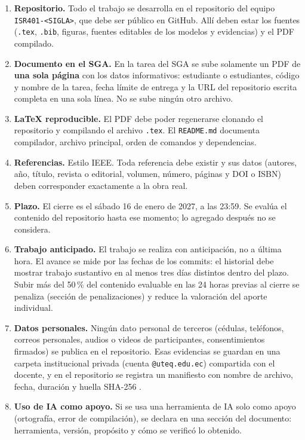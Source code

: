\documentclass[11pt]{article}
\begin{document}
\begin{enumerate}[leftmargin=20pt,itemsep=3pt]
	\item \textbf{Repositorio.} Todo el trabajo se desarrolla en el repositorio del equipo \texttt{ISR401-<SIGLA>}, que debe ser público en GitHub. Allí deben estar los fuentes (\texttt{.tex}, \texttt{.bib}, figuras, fuentes editables de los modelos y evidencias) y el PDF compilado.
	\item \textbf{Documento en el SGA.} En la tarea del SGA se sube solamente un PDF de \textbf{una sola página} con los datos informativos: estudiante o estudiantes, código y nombre de la tarea, fecha límite de entrega y la URL del repositorio escrita completa en una sola línea. No se sube ningún otro archivo.
	\item \textbf{\LaTeX{} reproducible.} El PDF debe poder regenerarse clonando el repositorio y compilando el archivo \texttt{.tex}. El \texttt{README.md} documenta compilador, archivo principal, orden de comandos y dependencias.
	\item \textbf{Referencias.} Estilo IEEE. Toda referencia debe existir y sus datos (autores, año, título, revista o editorial, volumen, número, páginas y DOI o ISBN) deben corresponder exactamente a la obra real.
	\item \textbf{Plazo.} El cierre es el sábado 16 de enero de 2027, a las 23:59. Se evalúa el contenido del repositorio hasta ese momento; lo agregado después no se considera.
	\item \textbf{Trabajo anticipado.} El trabajo se realiza con anticipación, no a última hora. El avance se mide por las fechas de los commits: el historial debe mostrar trabajo sustantivo en al menos tres días distintos dentro del plazo. Subir más del 50\,\% del contenido evaluable en las 24 horas previas al cierre se penaliza (sección de penalizaciones) y reduce la valoración del aporte individual.
	\item \textbf{Datos personales.} Ningún dato personal de terceros (cédulas, teléfonos, correos personales, audios o videos de participantes, consentimientos firmados) se publica en el repositorio. Esas evidencias se guardan en una carpeta institucional privada (cuenta \texttt{@uteq.edu.ec}) compartida con el docente, y en el repositorio se registra un manifiesto con nombre de archivo, fecha, duración y huella SHA-256 \citep{lopdp_2021}.
	\item \textbf{Uso de IA como apoyo.} Si se usa una herramienta de IA solo como apoyo (ortografía, error de compilación), se declara en una sección del documento: herramienta, versión, propósito y cómo se verificó lo obtenido.
\end{enumerate}
\end{document}
